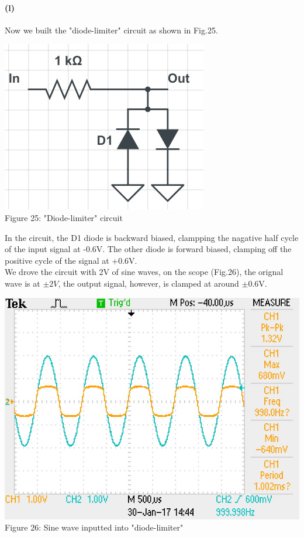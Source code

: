 \documentclass[]{article}
\begin{document}
	\paragraph{ (l)} 	
Now we built the "diode-limiter" circuit as shown in Fig.25. 
\begin{center}
	\includegraphics[scale=0.35]{l_circuit}\\
	Figure 25: "Diode-limiter" circuit 
\end{center}
In the circuit, the D1 diode is backward biased, clampping the nagative half cycle of the input signal at -0.6V. The other diode is forward biased, clamping off the positive cycle of the signal at +0.6V. 
\\We drove the circuit with 2V of sine waves, on the scope (Fig.26), the orignal wave is at $\pm 2V$, the output signal, however, is clamped at around $\pm$0.6V.
\begin{center}
	\includegraphics[scale=0.8]{l_sine}\\
	Figure 26: Sine wave inputted into "diode-limiter" 
\end{center}
\end{document}
